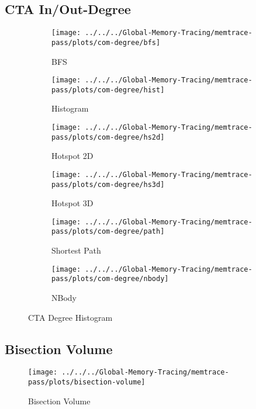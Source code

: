 \subsection{CTA In/Out-Degree}
\begin{figure}
	\begin{subfigure}[b]{0.45\textwidth}
		\texttt{[image: ../../../Global-Memory-Tracing/memtrace-pass/plots/com-degree/bfs]}
		\caption{BFS}
		\label{fig:deg-bfs}
	\end{subfigure}
	\begin{subfigure}[b]{0.45\textwidth}
		\texttt{[image: ../../../Global-Memory-Tracing/memtrace-pass/plots/com-degree/hist]}
		\caption{Histogram}
		\label{fig:deg-hist}
	\end{subfigure}
	\begin{subfigure}[b]{0.45\textwidth}
		\texttt{[image: ../../../Global-Memory-Tracing/memtrace-pass/plots/com-degree/hs2d]}
		\caption{Hotspot 2D}
		\label{fig:deg-hs2d}
	\end{subfigure}
	\begin{subfigure}[b]{0.45\textwidth}
		\texttt{[image: ../../../Global-Memory-Tracing/memtrace-pass/plots/com-degree/hs3d]}
		\caption{Hotspot 3D}
		\label{fig:deg-hs3d}
	\end{subfigure}
	\begin{subfigure}[b]{0.45\textwidth}
		\texttt{[image: ../../../Global-Memory-Tracing/memtrace-pass/plots/com-degree/path]}
		\caption{Shortest Path}
		\label{fig:deg-path}
	\end{subfigure}
	\hfill
	\begin{subfigure}[b]{0.45\textwidth}
		\texttt{[image: ../../../Global-Memory-Tracing/memtrace-pass/plots/com-degree/nbody]}
		\caption{NBody}
		\label{fig:deg-nbody}
	\end{subfigure}
	\caption{CTA Degree Histogram}
	\label{fig:Cta-degree}
\end{figure}
\subsection{Bisection Volume}
\begin{figure}[t]
	\centering
	\texttt{[image: ../../../Global-Memory-Tracing/memtrace-pass/plots/bisection-volume]}
	\caption{Bisection Volume}
	\label{bisection-vols}
\end{figure}
\newpage
